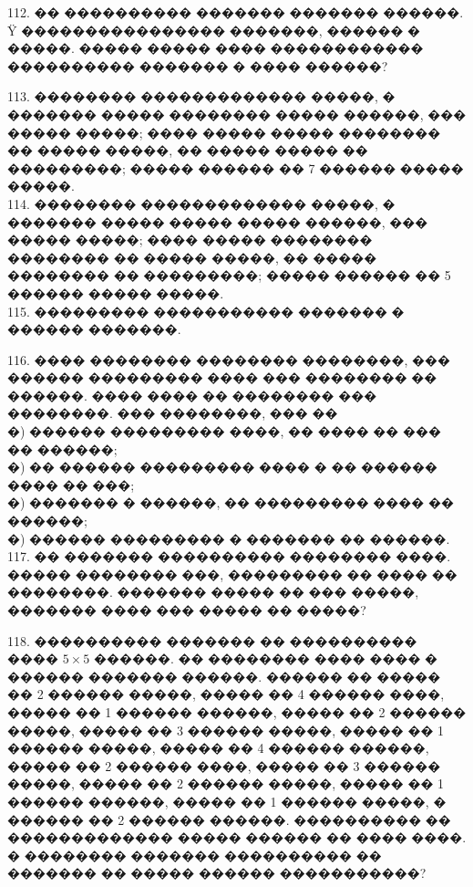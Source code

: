 \documentclass[12pt]{article}
\begin{document}
112. �� ���������� ������� ������� ������. Ÿ ���������������� �������, ������ � �����. ����� ����� ���� ������������ ���������� ������� � ���� ������?
\begin{center}
\begin{figure}[ht!]
\end{figure}
\end{center}
113. �������� ������������� �����, � ������� ����� �������� ����� ������, ��� ����� �����; ���� ����� ����� �������� �� ����� �����, �� ����� ����� �� ���������; ����� ������ �� 7 ������ ����� �����.\\
114. �������� ������������� �����, � ������� ����� ����� ����� ������, ��� ����� �����; ���� ����� �������� �������� �� ����� �����, �� ����� �������� �� ���������; ����� ������ �� 5 ������ ����� �����.\\
115. ��������� ����������� ������� � ������ �������.
\begin{center}
\begin{figure}[ht!]
\end{figure}
\end{center}
116. ���� �������� �������� ��������, ��� ������ ��������� ���� ��� �������� �� ������. ���� ���� �� �������� ��� ��������. ��� ��������, ��� ��\\
�) ������ ��������� ����, �� ���� �� ��� �� ������;\\
�) �� ������ ��������� ���� � �� ������ ���� �� ���;\\
�) ������� � ������, �� ��������� ���� �� ������;\\
�) ������ ��������� � ������� �� ������.\\
117. �� ������� ���������� �������� ����. ����� �������� ���, ��������� �� ���� �� ��������. ������� ����� �� ��� �����, ������� ���� ��� ����� �� �����?
\begin{center}
\begin{figure}[ht!]
\end{figure}
\end{center}
118. ���������� ������� �� ���������� ���� $5\times5$ ������. �� �������� ���� ���� � ������ ������� ������. ������ �� ����� �� 2 ������ �����, ����� �� 4 ������ ����, ����� �� 1 ������ ������, ����� �� 2 ������ �����, ����� �� 3 ������ �����, ����� �� 1 ������ �����, ����� �� 4 ������ ������, ����� �� 2 ������ ����, ����� �� 3 ������ �����, ����� �� 2 ������ �����, ����� �� 1 ������ ������, ����� �� 1 ������ �����, � ������ �� 2 ������ ������. ���������� �� ������������� ����� ������ �� ���� ����. � �������� ������� ���������� �� ������� �� ����� ������ �����������?\\
\end{document}
